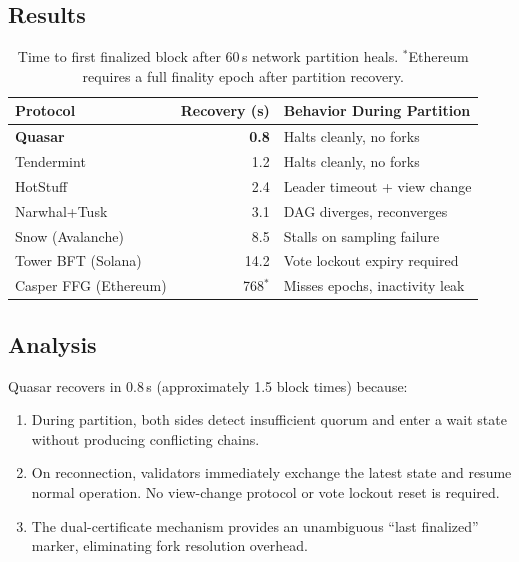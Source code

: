 \documentclass[11pt]{article}
\begin{document}
\subsection{Results}

\begin{table}[h]
\centering
\begin{tabular}{@{}lrl@{}}
\toprule
\textbf{Protocol} & \textbf{Recovery (s)} & \textbf{Behavior During Partition} \\
\midrule
\textbf{Quasar}        & \textbf{0.8}  & Halts cleanly, no forks \\
Tendermint             & 1.2           & Halts cleanly, no forks \\
HotStuff               & 2.4           & Leader timeout + view change \\
Narwhal+Tusk           & 3.1           & DAG diverges, reconverges \\
Snow (Avalanche)       & 8.5           & Stalls on sampling failure \\
Tower BFT (Solana)     & 14.2          & Vote lockout expiry required \\
Casper FFG (Ethereum)  & 768$^*$       & Misses epochs, inactivity leak \\
\bottomrule
\end{tabular}
\caption{Time to first finalized block after 60\,s network partition heals.
$^*$Ethereum requires a full finality epoch after partition recovery.}
\label{tab:partition}
\end{table}

\subsection{Analysis}

Quasar recovers in 0.8\,s (approximately 1.5 block times) because:

\begin{enumerate}
\item During partition, both sides detect insufficient quorum and enter a wait state
      without producing conflicting chains.
\item On reconnection, validators immediately exchange the latest state and resume
      normal operation. No view-change protocol or vote lockout reset is required.
\item The dual-certificate mechanism provides an unambiguous ``last finalized'' marker,
      eliminating fork resolution overhead.
\end{enumerate}
\end{document}
